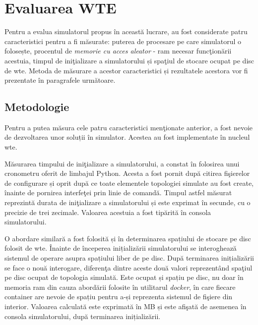 \section{Evaluarea WTE}

Pentru a evalua simulatorul propus în această lucrare, au fost considerate patru caracteristici pentru a fi măsurate: puterea de procesare pe care simulatorul o folosește, procentul de \textit{memorie cu acces aleator} - \gls{ram} necesar funcţionării acestuia, timpul de iniţializare a simulatorului și spaţiul de stocare ocupat pe disc de \gls{wte}. Metoda de măsurare a acestor caracteristici și rezultatele acestora vor fi prezentate în paragrafele următoare.

\subsection{Metodologie}

Pentru a putea măsura cele patru caracteristici menţionate anterior, a fost nevoie de dezvoltarea unor soluții în simulator. Acestea au fost implementate în nucleul \gls{wte}.

Măsurarea timpului de iniţializare a simulatorului, a constat în folosirea unui cronometru oferit de limbajul Python. Acesta a fost pornit după citirea fişierelor de configurare și oprit după ce toate elementele topologiei simulate au fost create, înainte de pornirea interfeţei prin linie de comandă. Timpul astfel măsurat reprezintă durata de iniţializare a simulatorului și este exprimat în secunde, cu o precizie de trei zecimale. Valoarea acestuia a fost tipărită în consola simulatorului.

O abordare similară a fost folosită și în determinarea spațiului de stocare pe disc folosit de \gls{wte}. Înainte de începerea inițializării simulatorului se interoghează sistemul de operare asupra spațiului liber de pe disc. După terminarea inițializării se face o nouă interogare, diferenţa dintre aceste două valori reprezentând spaţiul pe disc ocupat de topologia simulată. Este ocupat și spațiu pe disc, nu doar în memoria \gls{ram} din cauza abordării folosite în utilitarul \textit{docker}, în care fiecare container are nevoie de spațiu pentru a-și reprezenta sistemul de fişiere din interior. Valoarea calculată este exprimată în MB și este afişată de asemenea în consola simulatorului, după terminarea inițializării.

